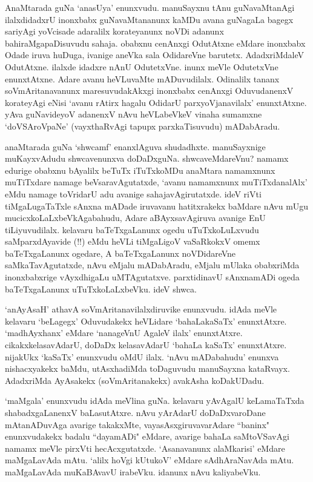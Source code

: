 AnaMtarada guNa `anasUya' enunxvudu. manuSayxnu tAnu guNavaMtanAgi ilalxdidadxrU inonxbabx guNavaMtananunx kaMDu avana guNagaLa bagegx sariyAgi 
yoVcisade adaralilx korateyanunx noVDi adanunx bahiraMgapaDisuvudu sahaja. obabxnu cenAnxgi OdutAtxne eMdare inonxbabx Odade iruva 
huDuga, ivanige aneVka sala OdidareVne barutetx. AdadxriMdaleV OdutAtxne. ilalxde idadxre nAnU OdutetxVne. inunx meVle OdutetxVne enunxtAtxne. 
Adare avanu heVLuvaMte mADuvudilalx. Odinalilx tananx soVmAritanavanunx maresuvudakAkxgi inonxbabx cenAnxgi OduvudanenxV korateyAgi eNisi `avanu 
rAtirx hagalu OdidarU parxyoVjanavilalx' enunxtAtxne. yAva guNavideyoV adanenxV nAvu heVLabeVkeV vinaha sumamxne `doVSAroVpaNe' (vayxthaRvAgi tapupx parxkaTisuvudu) mADabAradu.

anaMtarada guNa `shwcamf' enanxlAguva shudadhxte. manuSayxnige muKayxvAdudu shwcavenunxva doDaDxguNa. shwcaveMdareVnu? namamx edurige 
obabxnu bAyalilx beTuTx iTuTxkoMDu anaMtara namamxnunx muTiTxdare namage beVsaravAgutatxde, `avanu namamxnunx muTiTxdanalAlx' 
eMdu namage toVridarU adu avanige sahajavAgirutatxde. ideV riVti tiMgaLugaTaTxle sAnxna mADade iruvavanu hatitxrakekx baMdare nAvu 
mUgu mucicxkoLaLxbeVkAgabahudu, Adare aBAyxsavAgiruva avanige EnU tiLiyuvudilalx. kelavaru baTeTxgaLanunx ogedu uTuTxkoLuLxvudu 
saMparxdAyavide (!!) eMdu heVLi tiMgaLigoV vaSaRkokxV omemx baTeTxgaLanunx ogedare, A baTeTxgaLanunx noVDidareVne saMkaTavAgutatxde, nAvu eMjalu 
mADabAradu, eMjalu mUlaka obabxriMda inonxbabxrige vAyxdhigaLu uMTAgutatxve. parxtidinavU sAnxnamADi ogeda baTeTxgaLanunx uTuTxkoLaLxbeVku. ideV shwca.

`anAyAsaH' athavA soVmAritanavilalxdiruvike enunxvudu. idAda meVle kelavaru `beLagegx' Oduvudakekx heVLidare `bahaLakaSaTx' enunxtAtxre. 
`madhAyxhanx' eMdare `nanageVnU AgaleV ilalx' enunxtAtxre. cikakxkelasavAdarU, doDaDx kelasavAdarU `bahaLa kaSaTx' enunxtAtxre. nijakUkx `kaSaTx' enunxvudu oMdU ilalx. `nAvu 
mADabahudu' enunxva nishacxyakekx baMdu, utAsxhadiMda toDaguvudu manuSayxna kataRvayx. AdadxriMda AyAsakekx (soVmAritanakekx) avakAsha koDakUDadu.

`maMgala' enunxvudu idAda meVlina guNa. kelavaru yAvAgalU keLamaTaTxda shabadxgaLanenxV baLasutAtxre. nAvu yArAdarU doDaDxvaroDane mAtanADuvAga 
avarige takakxMte, vayasAsxgiruvavarAdare ``baninx" enunxvudakekx badalu ``dayamADi" eMdare, avarige bahaLa saMtoVSavAgi namamx meVle pirxVti hecAcxgutatxde. 
`Asanavanunx alaMkarisi' eMdare maMgaLavAda mAtu. `alilx hoVgi kUtukoV' eMdare sAdhAraNavAda mAtu. maMgaLavAda muKaBAvavU irabeVku. idanunx nAvu kaliyabeVku.

